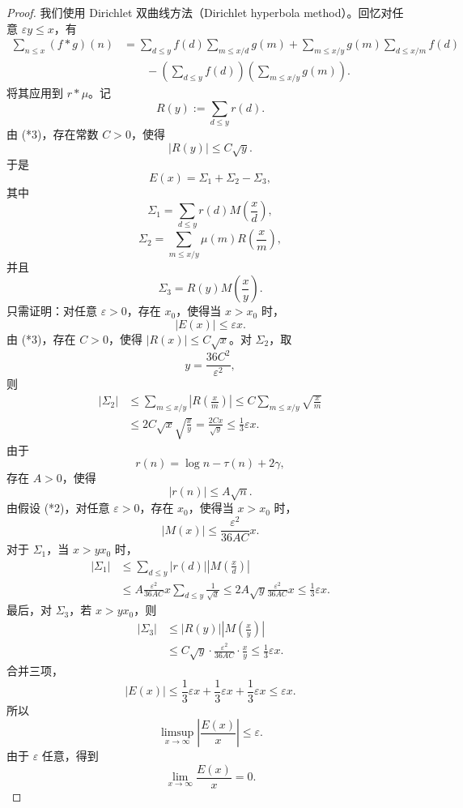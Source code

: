 \begin{proof}
	我们使用 Dirichlet 双曲线方法（Dirichlet hyperbola method）。回忆对任意 $\varepsilon y\leq x$，有
	\[
	\begin{aligned}
		\sum_{n\leq x}(f*g)(n)
		&=
		\sum_{d\leq y}f(d)\sum_{m\leq x/d}g(m)
		+
		\sum_{m\leq x/y}g(m)\sum_{d\leq x/m}f(d)\\
		&\qquad
		-
		\left(\sum_{d\leq y}f(d)\right)
		\left(\sum_{m\leq x/y}g(m)\right).
	\end{aligned}
	\]
	将其应用到 $r*\mu$。记
	\[
		R(y):=\sum_{d\leq y}r(d).
	\]
	由 (*3)，存在常数 $C>0$，使得
	\[
		|R(y)|\leq C\sqrt y.
	\]
	于是
	\[
		E(x)=\Sigma_1+\Sigma_2-\Sigma_3,
	\]
	其中
	\[
		\Sigma_1=\sum_{d\leq y}r(d)M\left(\frac xd\right),
	\]
	\[
		\Sigma_2=\sum_{m\leq x/y}\mu(m)R\left(\frac xm\right),
	\]
	并且
	\[
		\Sigma_3=R(y)M\left(\frac xy\right).
	\]
	只需证明：对任意 $\varepsilon>0$，存在 $x_0$，使得当 $x>x_0$ 时，
	\[
		|E(x)|\leq \varepsilon x.
	\]
	由 (*3)，存在 $C>0$，使得 $|R(x)|\leq C\sqrt x$。对 $\Sigma_2$，取
	\[
		y=\frac{36C^2}{\varepsilon^2},
	\]
	则
	\[
	\begin{aligned}
		|\Sigma_2|
		&\leq
		\sum_{m\leq x/y}\left|R\left(\frac xm\right)\right|
		\leq
		C\sum_{m\leq x/y}\sqrt{\frac xm}\\
		&\leq
		2C\sqrt x\sqrt{\frac xy}
		=
		\frac{2Cx}{\sqrt y}
		\leq
		\frac13\varepsilon x.
	\end{aligned}
	\]
	由于
	\[
		r(n)=\log n-\tau(n)+2\gamma,
	\]
	存在 $A>0$，使得
	\[
		|r(n)|\leq A\sqrt n.
	\]
	由假设 (*2)，对任意 $\varepsilon>0$，存在 $x_0$，使得当 $x>x_0$ 时，
	\[
		|M(x)|\leq \frac{\varepsilon^2}{36AC}x.
	\]
	对于 $\Sigma_1$，当 $x>yx_0$ 时，
	\[
	\begin{aligned}
		|\Sigma_1|
		&\leq
		\sum_{d\leq y}|r(d)|\left|M\left(\frac xd\right)\right|\\
		&\leq
		A\frac{\varepsilon^2}{36AC}x
		\sum_{d\leq y}\frac1{\sqrt d}
		\leq
		2A\sqrt y\frac{\varepsilon^2}{36AC}x
		\leq
		\frac13\varepsilon x.
	\end{aligned}
	\]
	最后，对 $\Sigma_3$，若 $x>yx_0$，则
	\[
	\begin{aligned}
		|\Sigma_3|
		&\leq
		|R(y)|\left|M\left(\frac xy\right)\right|\\
		&\leq
		C\sqrt y\cdot \frac{\varepsilon^2}{36AC}\cdot \frac xy
		\leq
		\frac13\varepsilon x.
	\end{aligned}
	\]
	合并三项，
	\[
		|E(x)|
		\leq
		\frac13\varepsilon x+\frac13\varepsilon x+\frac13\varepsilon x
		\leq
		\varepsilon x.
	\]
	所以
	\[
		\limsup_{x\to\infty}\left|\frac{E(x)}x\right|\leq \varepsilon.
	\]
	由于 $\varepsilon$ 任意，得到
	\[
		\lim_{x\to\infty}\frac{E(x)}x=0.
	\]
\end{proof}

